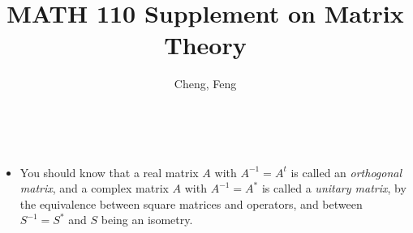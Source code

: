 \documentclass{article}
\title{MATH 110 Supplement on Matrix Theory}
\author{Cheng, Feng}
\makeatletter
\newcommand{\df}[1]{\textit{\textsf{#1}}}
\newcommand{\makemytitle}{
    \begin{center}
        {\Large \@title}
        \vspace{0.5em}
        \\ \@author
        \vspace{0.5em}
    \end{center}
}
\makeatother
\begin{document}
\makemytitle

\begin{itemize}
    \item You should know that a real matrix $A$ with $A^{-1} = A^t$ is called an \df{orthogonal matrix}, and a complex matrix $A$ with $A^{-1} = A^*$ is called a \df{unitary matrix}, by the equivalence between square matrices and operators, and between $S^{-1} = S^*$ and $S$ being an isometry.
    
\end{itemize}
\end{document}
